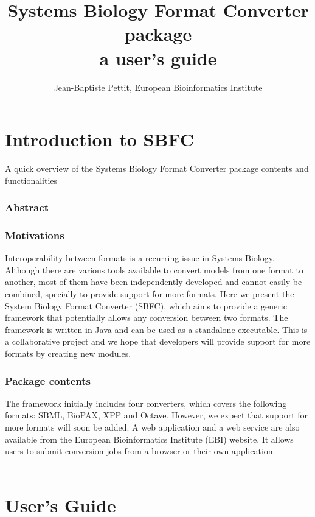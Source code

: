 \documentclass{article}
\begin{document}
\title{Systems Biology Format Converter package \\ a user's guide}
\author{Jean-Baptiste Pettit, European Bioinformatics Institute}
\maketitle
\newpage
{}
\tableofcontents
\newpage
{}
\part{Introduction to SBFC}
A quick overview of the Systems Biology Format Converter package contents and functionalities
\section{Abstract}
\section{Motivations}
Interoperability between formats is a recurring issue in Systems Biology. Although there are various tools available to
convert models from one format to another, most of them have been independently developed and cannot easily be
combined, specially to provide support for more formats. Here we present the System Biology Format Converter (SBFC),
which aims to provide a generic framework that potentially allows any conversion between two formats. The framework is
written in Java and can be used as a standalone executable. This is a collaborative project and we hope that developers
will provide support for more formats by creating new modules.
\section{Package contents}
The framework initially includes four converters, which covers the following formats: SBML, BioPAX, XPP and Octave.
However, we expect that support for more formats will soon be added. A web application and a web service are also
available from the European Bioinformatics Institute (EBI) website. It allows users to submit conversion jobs from a
browser or their own application.\\\\

\part{User's Guide}
\end{document}
